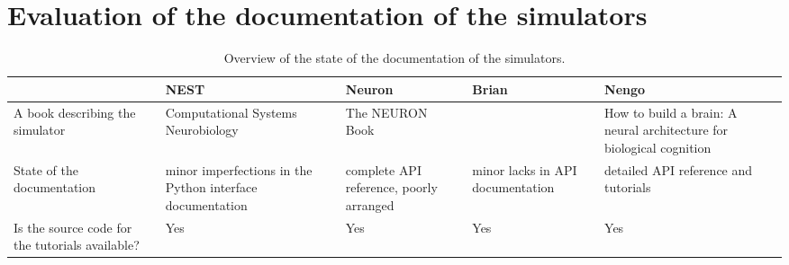 \chapter{Evaluation of the documentation of the simulators}
\label{appendix:c}
\begin{table}[htbp]
    \centering
    \begin{sideways}
        \begin{tabularx}{0.7\textheight}{*{5}{>{\raggedright\arraybackslash}X}}
            \toprule
             & NEST & Neuron & Brian & Nengo \\
            \midrule
            A book describing the simulator & Computational Systems Neurobiology \cite{lenovereComputationalSystemsNeurobiology2012}
            & The NEURON Book \cite{carnevaleNEURONBook06} & & How to build a brain: A neural architecture for biological cognition \cite{eliasmithHowBuild13} \\
            State of the documentation & minor imperfections in the Python interface documentation & complete API reference, poorly arranged & minor lacks in API documentation & detailed API reference and tutorials \\
            Is the source code for the tutorials available? & Yes & Yes & Yes & Yes \\
            \bottomrule
        \end{tabularx}
    \end{sideways}
    \caption{Overview of the state of the documentation of the simulators.}
\end{table}